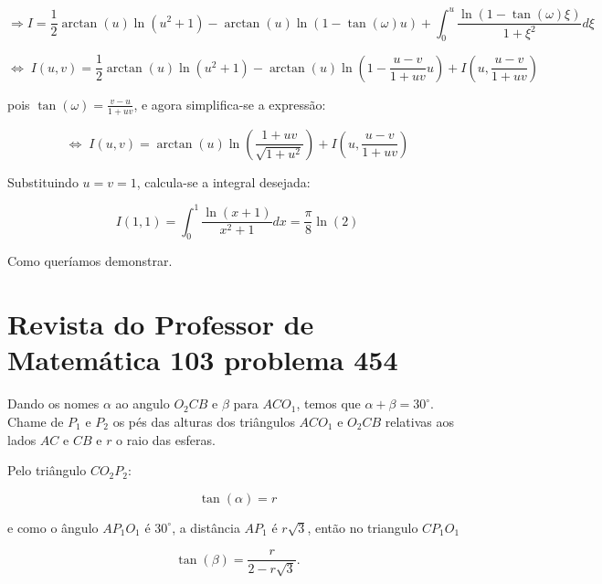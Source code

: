 $$\Rightarrow I=\frac{1}{2}\arctan(u)\ln(u^2+1)-\arctan(u)\ln(1-\tan(\omega)u) + \int_0^u\frac{\ln(1-\tan(\omega)\xi)}{1+\xi^2}d\xi$$

$$\Leftrightarrow\; I(u,v)=\frac{1}{2}\arctan(u)\ln(u^2+1)-\arctan(u)\ln\left(1-\frac{u-v}{1+uv}u\right) + I\left(u,\frac{u-v}{1+uv}\right)$$

pois $\tan(\omega)=\frac{v-u}{1+uv}$, e agora simplifica-se a expressão:

$$\Leftrightarrow\; I(u,v)=\arctan(u)\ln\left(\frac{1+uv}{\sqrt{1+u^2}}\right)+I\left(u,\frac{u-v}{1+uv}\right)$$

Substituindo $u=v=1$, calcula-se a integral desejada:

$$I(1,1) = \int_0^1\frac{\ln(x+1)}{x^2+1}dx = \frac{\pi}{8}\ln(2)$$

Como queríamos demonstrar.



\section{Revista do Professor de Matemática 103 problema 454}

\begin{center}
\end{center}

Dando os nomes $\alpha$ ao angulo $O_2CB$ e $\beta$ para $ACO_1$, temos que $\alpha+\beta=30^\circ$. Chame de $P_1$ e $P_2$ os pés das alturas dos triângulos $ACO_1$ e $O_2CB$ relativas aos lados $AC$ e $CB$ e $r$ o raio das esferas.

Pelo triângulo $CO_2P_2$:

$$\tan(\alpha)=r$$

e como o ângulo $AP_1O_1$ é $30^\circ$, a distância $AP_1$ é $r\sqrt{3}$, então no triangulo $CP_1O_1$

$$\tan(\beta)=\frac{r}{2-r\sqrt{3}}.$$

